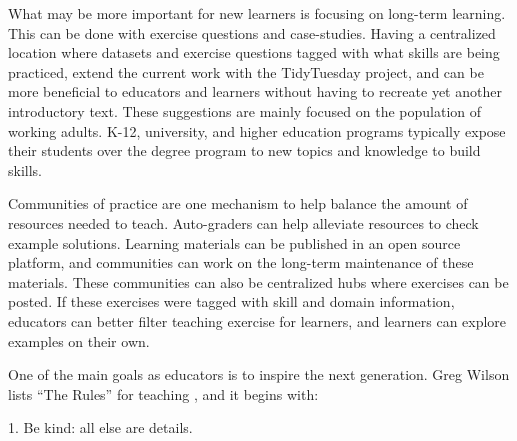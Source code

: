 \documentclass[../main.tex]{subfiles}
\begin{document}
What may be more important for new learners is focusing on long-term learning.
This can be done with exercise questions and case-studies.
Having a centralized location where datasets and exercise questions tagged with what skills are being practiced,
extend the current work with the TidyTuesday project,
and can be more beneficial to educators and learners without having to recreate yet another
introductory text.
These suggestions are mainly focused on the population of working adults.
K-12, university, and higher education programs typically expose their students
over the degree program to new topics and knowledge to build skills.

Communities of practice are one mechanism to help balance the amount of resources needed to teach.
Auto-graders can help alleviate resources to check example solutions.
Learning materials can be published in an open source platform,
and communities can work on the long-term maintenance of these materials.
These communities can also be centralized hubs where exercises can be posted.
If these exercises were tagged with skill and domain information,
educators can better filter teaching exercise for learners,
and learners can explore examples on their own.

One of the main goals as educators is to inspire the next generation.
Greg Wilson lists ``The Rules'' for teaching \cite{wilson2019teaching}, and it begins with:

\begin{displayquote}
    1. Be kind: all else are details.
\end{displayquote}
\end{document}
